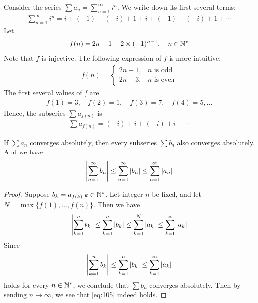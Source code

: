 \documentclass[thmcnt=section, 12pt]{my-elegantbook}
\begin{document}
\begin{example}
    Consider the series $\sum a_n = \sum_{n=1}^\infty i^n$. We write down its first several terms:
    \begin{align*}
        \sum_{n=1}^\infty i^n
        = i + (-1) + (-i) + 1 
        + i + (-1) + (-i) + 1 + \cdots 
    \end{align*}
    Let 
    \begin{align*}
        f(n) = 2n - 1 + 2 \times (-1)^{n-1},
        \quad n \in \mathbb{N}^\ast
    \end{align*}
    Note that $f$ is injective. The following expression of $f$ is more intuitive:
    \begin{align*}
        f(n) = \begin{cases}
            2n + 1,
            &\text{$n$ is odd} \\
            2n - 3,
            &\text{$n$ is even}
        \end{cases}
    \end{align*}
    The first several values of $f$ are 
    \begin{align*}
        f(1) = 3,
        \quad
        f(2) = 1,
        \quad
        f(3) = 7,
        \quad
        f(4) = 5,
        \ldots
    \end{align*}
    Hence, the subseries $\sum a_{f(n)}$ is 
    \begin{align*}
        \sum a_{f(n)} = (-i) + i + (-i) + i + \cdots
    \end{align*}
\end{example}


\begin{theorem} \label{thm:49}
    If $\sum a_n$ converges absolutely, then every subseries $\sum b_n$ also converges absolutely. And we have
    \begin{align}
        \left\lvert \sum_{n=1}^\infty b_n \right\rvert 
        \leq \sum_{n=1}^\infty \left\lvert b_n \right\rvert 
        \leq \sum_{n=1}^\infty \left\lvert a_n \right\rvert
        \label{eq:105}
    \end{align}
\end{theorem}

\begin{proof}
    Suppose $b_k = a_{f(k)} \; k \in \mathbb{N}^\ast$. Let integer $n$ be fixed, and let $N = \max \{ f(1), \ldots, f(n) \}$. Then we have 
    \begin{align*}
        \left\lvert \sum_{k=1}^n b_k \right\rvert 
        \leq \sum_{k=1}^n \left\lvert b_k \right\rvert 
        \leq \sum_{k=1}^N \left\lvert a_k \right\rvert
        \leq \sum_{k=1}^\infty \left\lvert a_k \right\rvert
    \end{align*}
    Since 
    \begin{align*}
        \left\lvert \sum_{k=1}^n b_k \right\rvert 
        \leq \sum_{k=1}^n \left\lvert b_k \right\rvert
        \leq \sum_{k=1}^\infty \left\lvert a_k \right\rvert
    \end{align*}
    holds for every $n \in \mathbb{N}^\ast$, we conclude that $\sum b_n$ converges absolutely. Then by sending $n \to \infty$, we see that \eqref{eq:105} indeed holds.
\end{proof}
\end{document}
